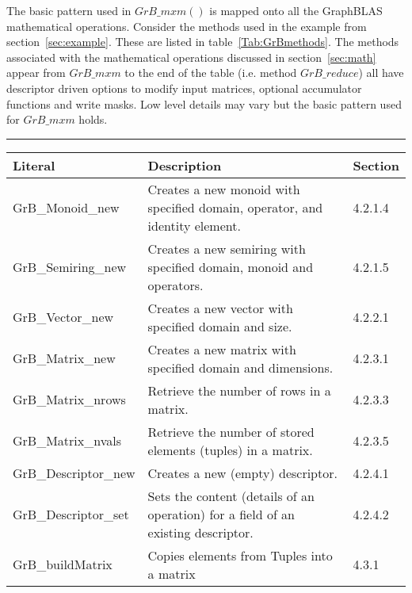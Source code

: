 The basic pattern used in $GrB\_mxm()$ is mapped onto all the GraphBLAS mathematical operations.  
Consider the methods used in the example from section~\ref{sec:example}.  These are listed in 
table~\ref{Tab:GrBmethods}.   The methods associated with the mathematical operations discussed in 
section~\ref{sec:math} appear from $GrB\_mxm$ to the end of the table (i.e. method $GrB\_reduce$)
all have descriptor driven options to modify input matrices, optional accumulator 
functions and write masks.   Low level details may vary but the basic pattern used
for $GrB\_mxm$ holds.
 
\begin{table*}[h]
\hrule
\begin{center}
\caption{The following methods are used in the Betweenness Centrality example in section~\ref{sec:example}..  The third 
column in this table refers to the section in the GraphBLAS C specification 1.0 where the method is more fully defined.}
\label{Tab:GrBmethods}
\begin{tabular}{lll}
Literal                 & Description  & Section \\
\hline
GrB\_Monoid\_new      & Creates a new monoid with specified domain, operator, and identity element. &  4.2.1.4 \\
GrB\_Semiring\_new    & Creates a new semiring with specified domain, monoid and operators.           & 4.2.1.5 \\
GrB\_Vector\_new        & Creates a new vector with specified domain and size.                                      & 4.2.2.1 \\
GrB\_Matrix\_new         & Creates a new matrix with specified domain and dimensions.                         &  4.2.3.1 \\
GrB\_Matrix\_nrows      & Retrieve the number of rows in a matrix.                                                          &  4.2.3.3 \\
GrB\_Matrix\_nvals       & Retrieve the number of stored elements (tuples) in a matrix.                            & 4.2.3.5 \\
GrB\_Descriptor\_new   & Creates a new (empty) descriptor.                                                                    &  4.2.4.1 \\
GrB\_Descriptor\_set     & Sets the content (details of an operation) for a field of an existing descriptor.  &  4.2.4.2 \\
GrB\_buildMatrix            & Copies elements from Tuples into a matrix                                                       &  4.3.1 \\

\end{tabular}
\end{center}
\end{table*}
